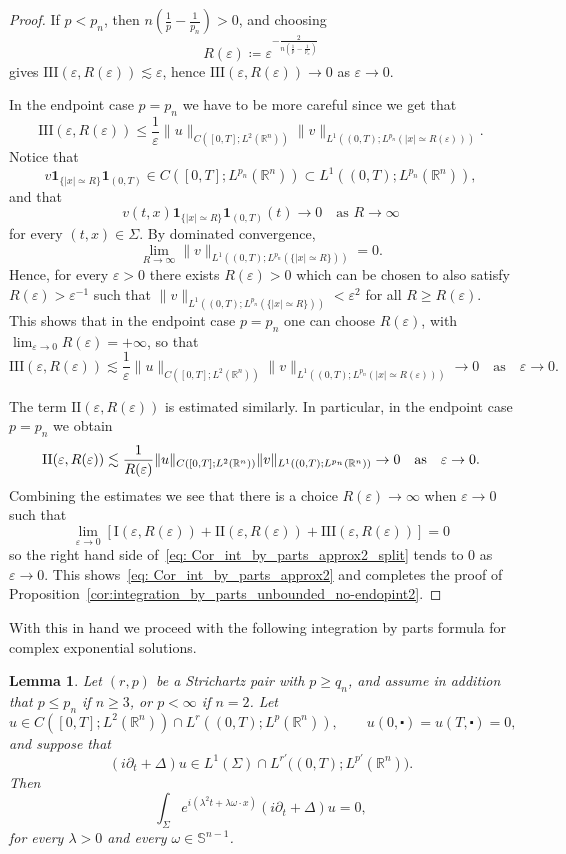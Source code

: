 \documentclass[11pt,a4paper]{amsart}
\newtheorem{lemma}[proposition]{Lemma}
\theoremstyle{remark}
\theoremstyle{definition}
\newcommand{\R}{\mathbb{R}}
\newcommand{\Sph}{\mathbb{S}}
\def\ve{\varepsilon}
\def\ind{\mathbf 1}
\def\cd{\centerdot}
\begin{document}
\begin{proof}
If $p<p_n$, then $n(\frac1p-\frac1{p_n})>0$, and choosing
\[
R(\varepsilon)\coloneqq \varepsilon^{-\frac{2}{n(\frac1p-\frac1{p_n})}}
\]
gives $\mathrm{III}(\varepsilon,R(\varepsilon))\lesssim \varepsilon$, hence $\mathrm{III}(\varepsilon,R(\varepsilon))\to0$ as $\varepsilon\to0$.

In the endpoint case $p=p_n$ we have to be more careful since we get that
\[
\mathrm{III}(\ve,R(\ve))
\leq \frac{1}{\ve}  \|u\|_{C([0, T]; L^2(\R^n))}  \|v\|_{L^1\left((0, T); L^{ p_n}(|x|\simeq R(\ve))\right)} .
\]
Notice that
\[
v\ind_{\{|x|\simeq R\}}\ind _{(0,T)} \in C\left([0,T];L^{p_n}(\R^n)\right) \subset L^1\left((0,T);L^{p_n}(\R^n)\right),
\]
and that
\[
v(t,x)\ind_{\{|x|\simeq R\}}\ind_{(0,T)}(t)\to0 \quad\text{as }R\to\infty
\]
for every $(t,x)\in\Sigma$. By dominated convergence,
\[
\lim_{R\to\infty} \|v\|_{L^1((0,T);L^{p_n}(\{|x|\simeq R\}))}=0.
\]
Hence, for every $\ve>0$ there exists $R(\ve)>0$ which can be chosen to also satisfy $R(\ve)>\ve^{-1}$ such that $\|  v \|_{L^1((0,T); L^{p_n}(\{|x|\simeq R\}))}<\ve ^2$ for all $R\geq R(\ve)$. This shows that in the endpoint case $p=p_n$ one can choose $R(\ve)$, with $\lim_{\ve\to0 }R(\ve)=+\infty$, so that
\[
\mathrm{III}(\ve,R(\ve)) \lesssim \frac{1}{\ve}  \|u\|_{C([0, T]; L^2(\R^n))}  \|v\|_{L^1((0, T); L^{p_n}(|x|\simeq R(\ve)))} \to 0 \quad \text{as}\quad \ve\to 0.
\]

The term $\mathrm{II}(\varepsilon,R(\varepsilon))$ is estimated similarly. In particular, in the endpoint case $p=p_n$ we obtain
\[
\mathrm{II}(\ve,R(\ve)) \lesssim  \frac{1}{R(\ve)} \|u\|_{C([0, T]; L^2(\R^n))} \|v\|_{L^1((0, T); L^{p_n}(\R^n))} \to 0 \quad \textup{as} \quad \ve\to 0. 
\]
Combining the estimates we see that there is a choice $R(\ve)\to \infty$ when $\ve\to 0$ such that 
\[
\lim_{\ve\to 0} \left[\mathrm{I}(\ve,R(\ve))+\mathrm{II}(\ve,R(\ve))+\mathrm{III}(\ve,R(\ve))\right]=0
\]
so the right hand side of~\eqref{eq: Cor_int_by_parts_approx2_split} tends to 0 as $\ve\to 0$. This  shows~\eqref{eq: Cor_int_by_parts_approx2} and completes the proof of  Proposition~\ref{cor:integration_by_parts_unbounded_no-endopint2}. 
\end{proof}

With this in hand we proceed with the following integration by parts formula for complex exponential solutions. 

\begin{lemma}\label{lem:int_by_parts_complex-exp_Lp}\sl Let $(r,p)$ be a Strichartz pair with $p\ge q_n$, and assume in addition that $p\le p_n$ if $n\ge3$, or $p<\infty$ if $n=2$. Let
\[
u\in C\left([0,T];L^2(\R^n)\right )\cap L^r\left((0,T);L^p(\R^n)\right), \qquad u(0,\cd)=u(T,\cd)=0,
\]
and suppose that
\[
(i\partial_t+\Delta)u\in L^1(\Sigma)\cap L^{r'}\big((0,T);L^{p'}(\R^n)\big).
\]
Then
\[
\int_\Sigma e^{i(\lambda^2 t+\lambda\omega\cdot x)}  (i\partial_t+\Delta)u = 0,
\]
for every $\lambda>0$ and every $\omega\in\Sph^{n-1}$.
\end{lemma}
\end{document}

